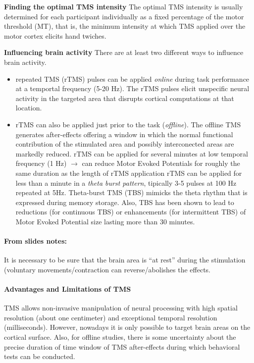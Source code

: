 \documentclass[12pt,article,oneside,a4paper]{memoir}
\begin{document}
\textbf{Finding the optimal TMS intensity} The optimal TMS intensity is usually
determined for each participant individually as a fixed percentage of the motor
threshold (MT), that is, the minimum intensity at which TMS applied over the 
motor cortex elicits hand twiches.

\textbf{Influencing brain activity} There are at least two different ways to influence
brain activity. 
\begin{itemize}
\item repeated TMS (rTMS) pulses can be applied \textit{online} during task performance
at a temportal frequency (5-20 Hz).
\subitem The rTMS pulses elicit unspecific neural activity in the targeted area that
disrupts cortical computations at that location.
\item rTMS can also be applied just prior to the task (\textit{offline}). The offline
TMS generates after-effects offering a window in which the normal functional 
contribution of the stimulated area and possibly interconected areas are markedly
reduced.
\subitem rTMS can be applied for several minutes at low temporal frequency (1 Hz)
$\rightarrow$ can reduce Motor Evoked Potentials for roughly the same duration as
the length of rTMS application
\subitem rTMS can be applied for less than a minute in a \textit{theta burst pattern},
tipically 3-5 pulses at 100 Hz repeated at 5Hz. Theta-burst TMS (TBS) mimicks the theta
rhythm that is expressed during memory storage. Also, TBS has been shown to lead to
reductions (for continuous TBS) or enhancements (for intermittent TBS) of Motor Evoked
Potential size lasting more than 30 minutes.
\end{itemize}

\paragraph{From slides notes:} It is necessary to be sure that the brain area is ``at
rest'' during the stimulation (voluntary movements/contraction can reverse/abolishes the
effects.

\paragraph{Advantages and Limitations of TMS}
TMS allows non-invasive manipulation of neural processing with high spatial
resolution (about one centimeter) and exceptional temporal resolution
(milliseconds). However, nowadays it is only possible to target brain areas on 
the cortical surface. Also, for offline studies, there is some uncertainty about
the precise duration of time window of TMS after-effects during which behavioral
tests can be conducted.
\end{document}
